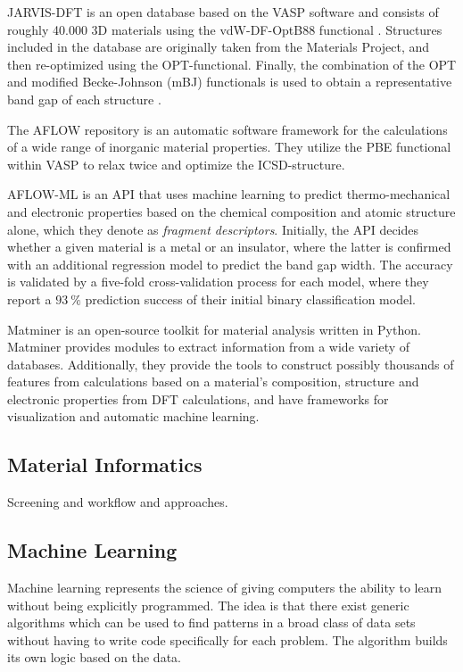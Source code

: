 \documentclass[superscriptaddress,unsortedaddress,
 amsmath,amssymb,
 aps,
]{revtex4-2}
\begin{document}
JARVIS-DFT \cite{Choudhary2020} is an open database based on the VASP software and consists of roughly 40.000 3D materials using the vdW-DF-OptB88 functional \cite{Thonhauser2007, Klimes2011}. Structures included in the database are originally taken from the Materials Project, and then re-optimized using the OPT-functional. Finally, the combination of the OPT and modified Becke-Johnson (mBJ) functionals is used to obtain a representative band gap of each structure \cite{Choudhary2018a}. 

The AFLOW \cite{Curtarolo2012, Curtarolo2012a, Calderon2015} repository is an automatic software framework for the calculations of a wide range of inorganic material properties. They utilize the PBE functional within VASP
to relax twice and optimize the ICSD-structure. 

AFLOW-ML \cite{Isayev2017} is an API that uses machine learning to predict thermo-mechanical and electronic properties based on the chemical composition and atomic structure alone, which they denote as \textit{fragment descriptors}. Initially, the API decides whether a given material is a metal or an insulator, where the latter is confirmed with an additional regression model to predict the band gap width. The accuracy is validated by a five-fold cross-validation process for each model, where they report a $93 \ \%$ prediction success of their initial binary classification model. 

Matminer \cite{Ward2018} is an open-source toolkit for material analysis written in Python. Matminer provides modules to extract information from a wide variety of databases. Additionally, they provide the tools to construct possibly thousands of features from calculations based on a material's composition, structure and electronic properties from DFT calculations, and have frameworks for visualization and automatic machine learning.

\subsection*{Material Informatics}  
Screening and workflow and approaches.  

\subsection*{Machine Learning} 

Machine learning  represents the science of giving computers the ability to learn without being explicitly programmed. The idea is that there exist generic algorithms which can be used to find patterns in a broad class of data sets without having to write code specifically for each problem. The algorithm builds its own logic based on the data. 
\end{document}
